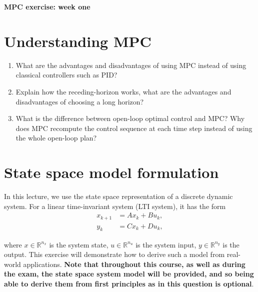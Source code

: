 \begin{center}
\normalfont\Large\bfseries MPC exercise: week one
\end{center}

\section{Understanding MPC}
\begin{enumerate}
    \item What are the advantages and disadvantages of using MPC instead of using classical controllers such as PID?\vspace{3\baselineskip}
    \item Explain how the receding-horizon works, what are the advantages and disadvantages of choosing a long horizon? \vspace{3\baselineskip}
    \item What is the difference between open-loop optimal control and MPC? Why does MPC recompute the control sequence at each time step instead of using the whole open-loop plan?\vspace{3\baselineskip}
    
\end{enumerate}


\section{State space model formulation}
In this lecture, we use the state space representation of a discrete dynamic system. For a linear time-invariant system (LTI system), it has the form
\begin{align*}
    x_{k+1} & = Ax_k + Bu_k,\\
    y_{k} & = Cx_k+ Du_k,
\end{align*}

where $x\in \mathbb{R}^{n_x}$ is the system state, $u\in\mathbb{R}^{n_u}$ is the system input, $y\in \mathbb{R}^{n_y}$ is the output. This exercise will demonstrate how to derive such a model from real-world applications. \textbf{Note that throughout this course, as well as during the exam, the state space system model will be provided, and so being able to derive them from first principles as in this question is optional}. 

